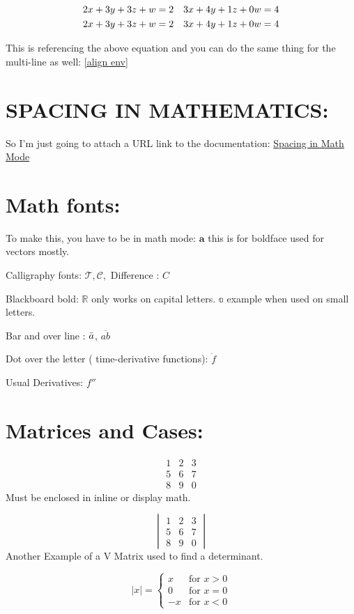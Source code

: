 \documentclass{report}
\theoremstyle{plain} %
\begin{document}
\begin{align} \label{align env}
     2x+3y+3z+w &= 2 & 3x+4y+1z+0w = 4 \\ \notag
     2x+3y+3z+w &= 2 & 3x+4y+1z+0w = 4 \notag
\end{align}

This is referencing the above equation and you can do the same thing for the multi-line as well: \eqref{align env}

 \section{SPACING IN MATHEMATICS:}

 So I'm just going to attach a URL link to the documentation: \href{https://www.overleaf.com/learn/latex/Spacing_in_math_mode}{Spacing in Math Mode}

\section{Math fonts:}
 To make this, you have to be in math mode: $\mathbf{a}$ this is for boldface used for vectors mostly.

 Calligraphy fonts: $\mathcal{T} , \mathcal{C},$ Difference : $C$

 Blackboard bold: $\mathbb{R}$ only works on capital letters. $\mathbb{a}$ example when used on small letters.


Bar and over line : $\Bar{a}$, $\overline{ab}$

Dot over the letter ( time-derivative functions): $\dot f$

Usual  Derivatives: $f''$

\newpage
\section{Matrices and Cases:}
\[
\begin{matrix}
    1 & 2 & 3 \\
    5 & 6 & 7 \\
    8 & 9 & 0
\end{matrix}
\] Must be enclosed in inline or display math.

\[
\begin{vmatrix}
    1 & 2 & 3 \\
    5 & 6 & 7 \\
    8 & 9 & 0
\end{vmatrix}
\] Another Example of a V Matrix used to find a determinant.

\[
|x| = 
\begin{cases}
    x &  \text{for } x > 0 \\
    0 & \text {for } x = 0 \\
    -x & \text{for } x < 0
\end{cases}
\]
\end{document}
